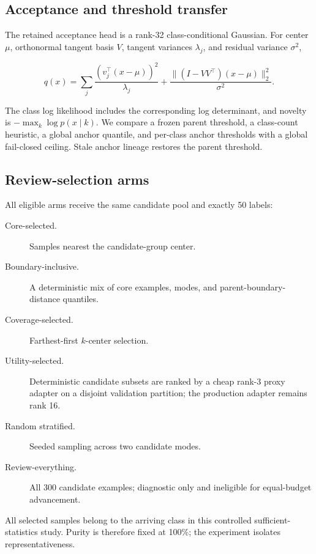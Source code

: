 \documentclass[10pt]{article}
\begin{document}
\subsection{Acceptance and threshold transfer}

The retained acceptance head is a rank-32 class-conditional Gaussian. For
center $\mu$, orthonormal tangent basis $V$, tangent variances $\lambda_j$,
and residual variance $\sigma^2$,

\begin{equation}
q(x)=
\sum_j\frac{(v_j^\top(x-\mu))^2}{\lambda_j}
+
\frac{\lVert(I-VV^\top)(x-\mu)\rVert_2^2}{\sigma^2}.
\end{equation}

The class log likelihood includes the corresponding log determinant, and
novelty is $-\max_k\log p(x\mid k)$. We compare a frozen parent threshold, a
class-count heuristic, a global anchor quantile, and per-class anchor
thresholds with a global fail-closed ceiling. Stale anchor lineage restores the
parent threshold.

\subsection{Review-selection arms}

All eligible arms receive the same candidate pool and exactly 50 labels:

\begin{description}
  \item[Core-selected.] Samples nearest the candidate-group center.
  \item[Boundary-inclusive.] A deterministic mix of core examples, modes, and
  parent-boundary-distance quantiles.
  \item[Coverage-selected.] Farthest-first $k$-center selection.
  \item[Utility-selected.] Deterministic candidate subsets are ranked by a
  cheap rank-3 proxy adapter on a disjoint validation partition; the production
  adapter remains rank 16.
  \item[Random stratified.] Seeded sampling across two candidate modes.
  \item[Review-everything.] All 300 candidate examples; diagnostic only and
  ineligible for equal-budget advancement.
\end{description}

All selected samples belong to the arriving class in this controlled
sufficient-statistics study. Purity is therefore fixed at 100\%; the
experiment isolates representativeness.
\end{document}
